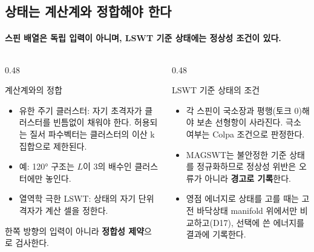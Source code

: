 \subsection{상태는 계산계와 정합해야 한다}\label{state-geometry}
\begingroup%
  \framesubtitle{스핀 배열은 독립 입력이 아니며, LSWT 기준 상태에는 정상성 조건이 있다.}
  \begin{columns}[T,onlytextwidth]
    \begin{column}{0.48\textwidth}
      \begin{block}{계산계와의 정합}
        \begin{itemize}
          \item 유한 주기 클러스터: 자기 초격자가 클러스터를 빈틈없이 채워야 한다.
            허용되는 질서 파수벡터는 클러스터의 이산 k 집합으로 제한된다.
          \item 예: 120° 구조는 $L$이 3의 배수인 클러스터에만 놓인다.
          \item 열역학 극한 LSWT: 상태의 자기 단위격자가 계산 셀을 정한다.
        \end{itemize}
      \end{block}
      \smallskip
      한쪽 방향의 입력이 아니라 \textbf{정합성 제약}으로 검사한다.
    \end{column}
    \begin{column}{0.48\textwidth}
      \begin{block}{LSWT 기준 상태의 조건}
        \begin{itemize}
          \item 각 스핀이 국소장과 평행(토크 0)해야 보손 선형항이 사라진다.
            극소 여부는 Colpa 조건으로 판정한다.
          \item MAGSWT는 불안정한 기준 상태를 정규화하므로 정상성 위반은
            오류가 아니라 \textbf{경고로 기록}한다.
          \item 영점 에너지로 상태를 고를 때는 고전 바닥상태 manifold 위에서만 비교하고(D17),
            선택에 쓴 에너지를 결과에 기록한다.
        \end{itemize}
      \end{block}
    \end{column}
  \end{columns}
  \par\medskip
\endgroup

